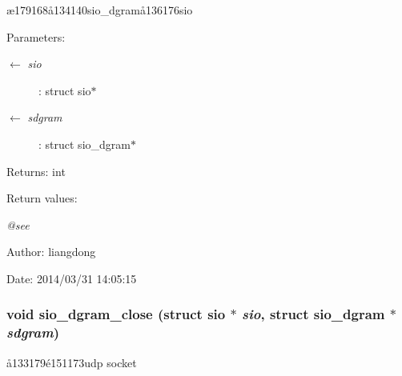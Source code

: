 \ae{}179168\aa{}134140sio\_\-dgram\aa{}136176sio 

\begin{Desc}
\item[Parameters:]
\begin{description}
\item[\mbox{$\leftarrow$} {\em sio}]: struct sio$\ast$ \item[\mbox{$\leftarrow$} {\em sdgram}]: struct sio\_\-dgram$\ast$ \end{description}
\end{Desc}
\begin{Desc}
\item[Returns:]int \end{Desc}
\begin{Desc}
\item[Return values:]
\begin{description}
\item[{\em @see}]\end{description}
\end{Desc}
\begin{Desc}
\item[Author:]liangdong \end{Desc}
\begin{Desc}
\item[Date:]2014/03/31 14:05:15 \end{Desc}
\subsubsection{\setlength{\rightskip}{0pt plus 5cm}void sio\_\-dgram\_\-close (struct sio $\ast$ {\em sio}, struct sio\_\-dgram $\ast$ {\em sdgram})}\label{sio__dgram_8h_a2}


\aa{}133179\'{e}151173udp socket 

